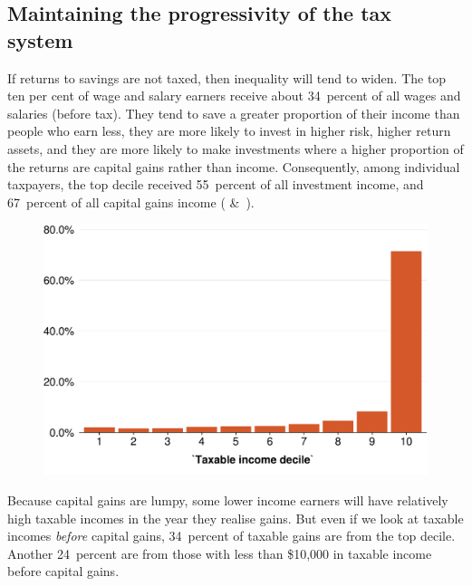 \documentclass{grattan}\usepackage[]{graphicx}\usepackage[]{color}
\begin{document}
\subsection{Maintaining the progressivity of the tax system}\label{sec:maintaining-progressivity-tax-system}


If returns to savings are not taxed, then inequality will tend to widen. The top ten per cent of wage and salary earners receive about 34~percent of all wages and salaries (before tax). They tend to save a greater proportion of their income than people who earn less, they are more likely to invest in higher risk, higher return assets, and they are more likely to make investments where a higher proportion of the returns are capital gains rather than income.  Consequently, among individual taxpayers, the top decile received 55~percent of all investment income, and 67~percent of all capital gains income ( \&\ ). 

\begin{figure}

\includegraphics[width=\columnwidth]{CGT-NG-atlas//CG-by-decile-1}
\end{figure}



Because capital gains are lumpy, some lower income earners will have relatively high taxable incomes in the year they realise gains. But even if we look at taxable incomes \emph{before} capital gains, 34~percent of taxable gains are from the top decile. Another 24~percent are from those with less than \$10,000 in taxable income before capital gains.
\end{document}
